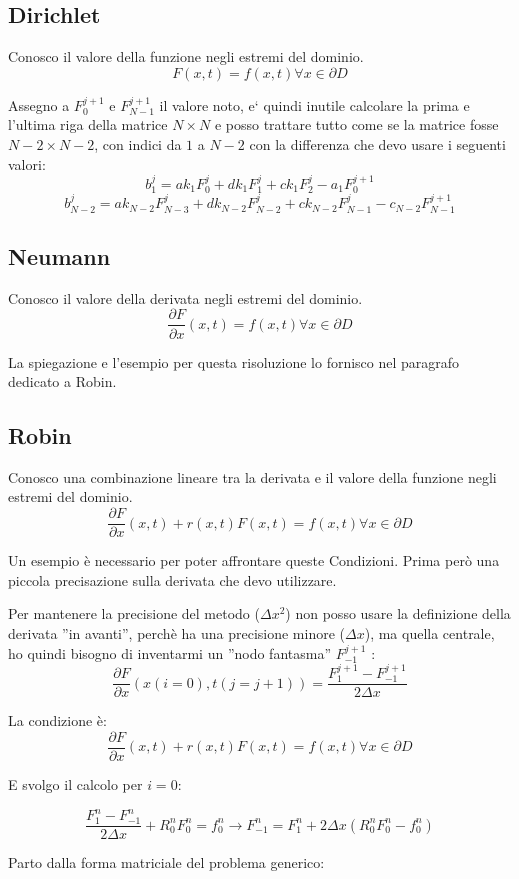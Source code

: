 \documentclass[]{article}
\newcommand{\pde}[2]{\ensuremath{\frac{\partial #1}{\partial #2}}}
\newcommand{\lr}[3]{\ensuremath{\left#1 #3 \right#2}}
\newcommand{\lrt}[1]{\lr{(}{)}{#1}}
\numberwithin{equation}{subsection}
\begin{document}
\subsection{Dirichlet}
Conosco il valore della funzione negli estremi del dominio.
$$F(x,t) = f(x,t) \forall x \in \partial D$$

Assegno a $F_0^{j+1}$ e $F_{N-1}^{j+1}$ il valore noto, e` quindi inutile calcolare la prima e l'ultima riga della matrice $N\times N$ e posso trattare tutto come se la matrice fosse $N-2\times N-2$, con indici da $1$ a $N-2$ con la differenza che devo usare i seguenti valori:
$$b_1^j = ak_1 F_{0}^{j}+ dk_1 F_{1}^{j} + ck_1 F_{2}^{j} - a_1 F_0^{j+1} $$
$$b_{N-2}^j = ak_{N-2} F_{N-3}^{j}+ dk_{N-2} F_{N-2}^{j} + ck_{N-2} F_{N-1}^{j} - c_{N-2} F_{N-1}^{j+1} $$
\subsection{Neumann}
Conosco il valore della derivata negli estremi del dominio.
$$\pde Fx(x,t) = f(x,t) \forall x \in \partial D$$

La spiegazione e l'esempio per questa risoluzione lo fornisco nel paragrafo dedicato a Robin.

\subsection{Robin}
Conosco una combinazione lineare tra la derivata e il valore della funzione negli estremi del dominio.
$$\pde Fx(x,t) +r(x,t) F(x,t) = f(x,t) \forall x \in \partial D$$

Un esempio \`e necessario per poter affrontare queste Condizioni. Prima per\`o una piccola precisazione sulla derivata che devo utilizzare.

Per mantenere la precisione del metodo ($\Delta x^2$) non posso usare la definizione della derivata ''in avanti'', perch\`e ha una precisione minore ($\Delta x$), ma quella centrale,  ho quindi bisogno di inventarmi un ''nodo fantasma'' $F_{-1}^{j+1}$ :
$$\pde Fx(x(i=0),t(j=j+1)) = \frac{F_{1}^{j+1}-F_{-1}^{j+1}}{2\Delta x}$$

La condizione \`e:
$$\pde Fx(x,t) +r(x,t) F(x,t) = f(x,t) \forall x \in \partial D$$

E svolgo il calcolo per $i=0$:

$$\frac{F_{1}^{n}-F_{-1}^{n}}{2\Delta x} + R_0^nF_{0}^{n} = f_0^n  \to 
F_{-1}^{n} = F_{1}^{n} + 2\Delta x \lrt{R_0^nF_{0}^{n}-f^n_0}$$

Parto dalla forma matriciale del problema generico:
\end{document}
